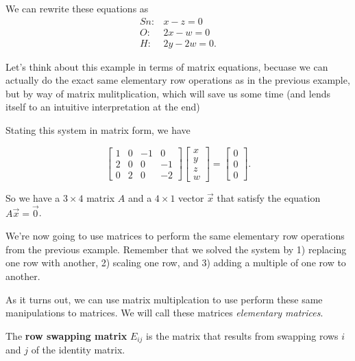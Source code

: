 \documentclass{ximera}
\begin{document}
\begin{exploration}
\begin{example}
We can rewrite these equations as
\begin{equation*}
  \begin{array}{cl}
    Sn: & x - z = 0 \\
    O: & 2x - w = 0 \\
    H: & 2y - 2w = 0.
  \end{array}
\end{equation*}

Let's think about this example in terms of matrix equations, becuase we can actually do the exact same elementary row operations as in the previous example, but by way of matrix mulitplication, which will save us some time (and lends itself to an intuitive interpretation at the end)

Stating this system in matrix form, we have

\begin{equation*}
  \begin{bmatrix}
    1 & 0 & -1 & 0 \\
    2 & 0 & 0 & -1 \\
    0 & 2 & 0 & -2
  \end{bmatrix}
  \begin{bmatrix}
    x \\
    y \\
    z \\
    w
  \end{bmatrix}
  =
  \begin{bmatrix}
    0 \\
    0 \\
    0
  \end{bmatrix}.
\end{equation*}

So we have a $3\times 4$ matrix $A$ and a $4\times 1$ vector $\vec{x}$ that satisfy the equation $A\vec{x} = \vec{0}$.

\begin{remark}

  We're now going to use matrices to perform the same elementary row operations from the previous example. Remember that we solved the system by 1) replacing one row with another, 2) scaling one row, and 3) adding a multiple of one row to another.

  As it turns out, we can use matrix multiplcation to use perform these same manipulations to matrices. We will call these matrices \emph{elementary matrices}.

  \begin{definition}
    The \textbf{row swapping matrix} $E_{ij}$ is the matrix that results from swapping rows $i$ and $j$ of the identity matrix.


\end{definition}
\end{remark}
\end{example}
\end{exploration}
\end{document}
